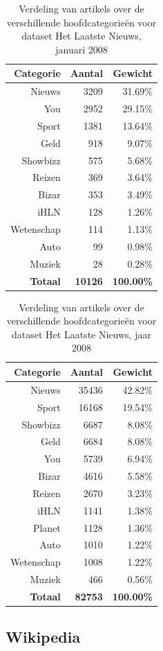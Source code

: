 \begin{table}[htbp]
	\centering
	\caption{Verdeling van artikels over de verschillende hoofdcategorie\"en voor dataset Het Laatste Nieuws, januari 2008}
	\begin{tabular}{rrr}
		\toprule
		Categorie & Aantal & Gewicht \\
		\midrule
		Nieuws & 3209  & 31.69\% \\
		You   & 2952  & 29.15\% \\
		Sport & 1381  & 13.64\% \\
		Geld  & 918   & 9.07\% \\
		Showbizz & 575   & 5.68\% \\
		Reizen & 369   & 3.64\% \\
		Bizar & 353   & 3.49\% \\
		iHLN  & 128   & 1.26\% \\
		Wetenschap & 114   & 1.13\% \\
		Auto  & 99    & 0.98\% \\
		Muziek & 28    & 0.28\% \\
		\textbf{Totaal} & \textbf{10126} &\textbf{ 100.00\%} \\
		\bottomrule
	\end{tabular}%
	\label{tab:hln-2008-01-cat}%
\end{table}%


\begin{table}[htbp]
	\centering
	\caption{Verdeling van artikels over de verschillende hoofdcategorie\"en voor dataset Het Laatste Nieuws, jaar 2008}
	\begin{tabular}{rrr}
		\toprule
		Categorie & Aantal & Gewicht \\
		\midrule
		Nieuws & 35436 & 42.82\% \\
		Sport & 16168 & 19.54\% \\
		Showbizz & 6687  & 8.08\% \\
		Geld  & 6684  & 8.08\% \\
		You   & 5739  & 6.94\% \\
		Bizar & 4616  & 5.58\% \\
		Reizen & 2670  & 3.23\% \\
		iHLN  & 1141  & 1.38\% \\
		Planet & 1128  & 1.36\% \\
		Auto  & 1010  & 1.22\% \\
		Wetenschap & 1008  & 1.22\% \\
		Muziek & 466   & 0.56\% \\
		\textbf{Totaal} & \textbf{82753} & \textbf{100.00\%} \\
		\bottomrule
	\end{tabular}%
	\label{tab:hln-2008-cat}%
\end{table}%

\subsection{Wikipedia}


